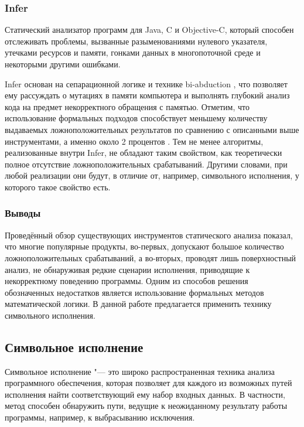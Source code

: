 \subsubsection{Infer}

Статический анализатор программ для Java, C и Objective-C, который способен отслеживать проблемы, вызванные разыменованиями нулевого указателя, утечками ресурсов и памяти, гонками данных в многопоточной среде и некоторыми другими ошибками.

Infer основан на сепарационной логике \cite{seplog} и технике bi-abduction \cite{biab}, что позволяет ему рассуждать о мутациях в памяти компьютера и выполнять глубокий анализ кода на предмет некорректного обращения с памятью. Отметим, что использование формальных подходов способствует меньшему количеству выдаваемых ложноположительных результатов по сравнению с описанными выше инструментами, а именно около 2 процентов \cite{infer-fp}. 
Тем не менее алгоритмы, реализованные внутри Infer, не обладают таким свойством, как теоретически полное отсутствие ложноположительных срабатываний. Другими словами, при любой реализации они будут, в отличие от, например, символьного исполнения, у которого такое свойство есть.

\subsubsection{Выводы}

Проведённый обзор существующих инструментов статического анализа показал, что многие популярные продукты, во-первых, допускают большое количество ложноположительных срабатываний, а во-вторых, проводят лишь поверхностный анализ, не обнаруживая редкие сценарии исполнения, приводящие к некорректному поведению программы. Одним из способов решения обозначенных недостатков является использование формальных методов математической логики. В данной работе предлагается применить технику символьного исполнения.

\newpage

\subsection{Символьное исполнение}

Символьное исполнение \cite{sym-3d, sym-sur} "--- это широко распространенная техника анализа программного обеспечения, которая позволяет для каждого из возможных путей исполнения найти соответствующий ему набор входных данных. В частности, метод способен обнаружить пути, ведущие к неожиданному результату работы программы, например, к выбрасыванию исключения.

